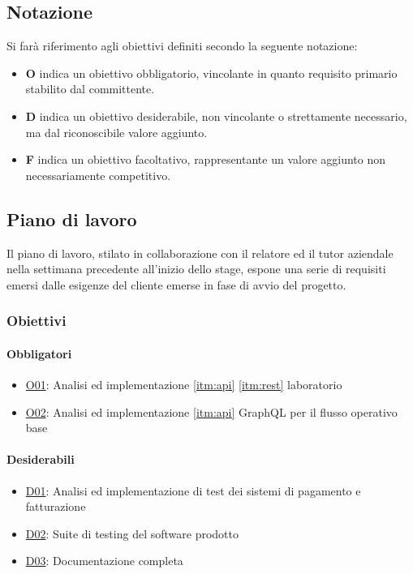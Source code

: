 \subsection{Notazione}
Si farà riferimento agli obiettivi definiti secondo la seguente notazione:
\begin{itemize}
    \item \textbf{O} indica un obiettivo obbligatorio, vincolante in quanto requisito primario stabilito dal committente.
    \item \textbf{D} indica un obiettivo desiderabile, non vincolante o strettamente necessario, ma dal riconoscibile valore aggiunto.
    \item \textbf{F} indica un obiettivo facoltativo, rappresentante un valore aggiunto non necessariamente competitivo.
\end{itemize}
\vspace{-12pt}
\subsection{Piano di lavoro}
Il piano di lavoro, stilato in collaborazione con il relatore ed il tutor aziendale nella settimana precedente all'inizio dello stage, espone una serie di requisiti emersi dalle esigenze del cliente emerse in fase di avvio del progetto.
\subsubsection{Obiettivi}
\paragraph{Obbligatori}
\begin{itemize}
    \item \underline{O01}: Analisi ed implementazione \ref{itm:api} \ref{itm:rest} laboratorio
    \item \underline{O02}: Analisi ed implementazione \ref{itm:api} GraphQL per il flusso operativo base
\end{itemize}
\vspace{-12pt}
\paragraph{Desiderabili}
\begin{itemize}
    \item \underline{D01}: Analisi ed implementazione di test dei sistemi di pagamento e fatturazione
    \item \underline{D02}: Suite di testing del software prodotto
    \item \underline{D03}: Documentazione completa
\end{itemize}
\vspace{-12pt}
